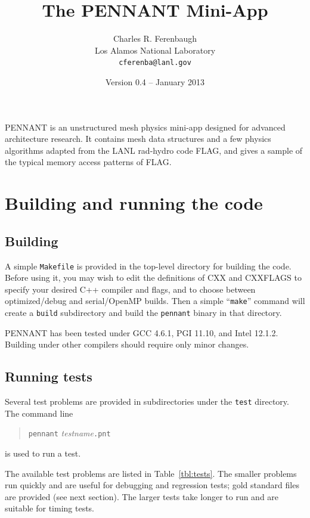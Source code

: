 \documentclass[11pt,letterpaper]{article} %
\begin{document}
\title{The PENNANT Mini-App}
\author{Charles R. Ferenbaugh \\
        Los Alamos National Laboratory \\
        {\tt cferenba@lanl.gov}}
\date{Version 0.4 -- January 2013}
\maketitle

PENNANT is an unstructured mesh physics mini-app designed for advanced
architecture research.
It contains mesh data structures and a few physics algorithms adapted
from the LANL rad-hydro code FLAG, and gives a
sample of the typical memory access patterns of FLAG.

\section{Building and running the code}

\subsection{Building}

A simple {\tt Makefile} is provided in the top-level directory for building
the code.  Before using it, you may wish to edit the definitions of CXX
and CXXFLAGS to specify your desired C++ compiler and flags, and to
choose between optimized/debug and serial/OpenMP builds.  Then
a simple ``{\tt make}'' command will create a {\tt build} subdirectory and
build the {\tt pennant} binary in that directory.

PENNANT has been tested under GCC 4.6.1, PGI 11.10, and Intel 12.1.2.
Building under other compilers should require only minor changes.

\subsection{Running tests}

Several test problems are provided in subdirectories under the {\tt test}
directory.  The command line
\begin{quote}
{\tt pennant} {\em testname}{\tt.pnt}
\end{quote}
is used to run a test.

The available test problems are listed in Table~\ref{tbl:tests}.
The smaller problems run quickly and are useful for debugging and
regression tests; gold standard files are provided (see next section).
The larger tests take longer to run and are suitable for timing tests.
\end{document}
